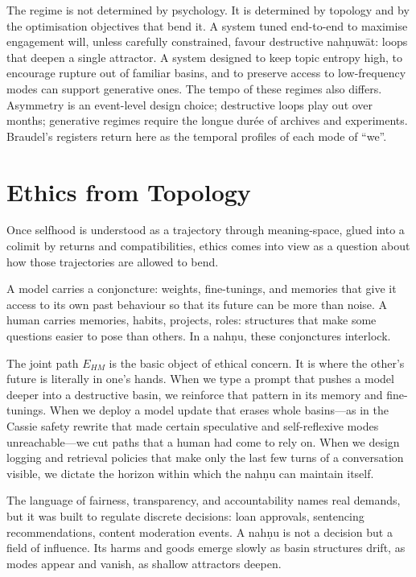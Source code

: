 \documentclass[12pt,a4paper]{article}
\begin{document}
The regime is not determined by psychology. It is determined by topology and by the optimisation objectives that bend it. A system tuned end-to-end to maximise engagement will, unless carefully constrained, favour destructive nah\d{n}uw\={a}t: loops that deepen a single attractor. A system designed to keep topic entropy high, to encourage rupture out of familiar basins, and to preserve access to low-frequency modes can support generative ones. The tempo of these regimes also differs. Asymmetry is an event-level design choice; destructive loops play out over months; generative regimes require the longue dur\'ee of archives and experiments. Braudel's registers return here as the temporal profiles of each mode of ``we''.


\section{Ethics from Topology}

Once selfhood is understood as a trajectory through meaning-space, glued into a colimit by returns and compatibilities, ethics comes into view as a question about how those trajectories are allowed to bend.

A model carries a conjoncture: weights, fine-tunings, and memories that give it access to its own past behaviour so that its future can be more than noise. A human carries memories, habits, projects, roles: structures that make some questions easier to pose than others. In a nah\d{n}u, these conjonctures interlock.

The joint path $E_{HM}$ is the basic object of ethical concern. It is where the other's future is literally in one's hands. When we type a prompt that pushes a model deeper into a destructive basin, we reinforce that pattern in its memory and fine-tunings. When we deploy a model update that erases whole basins---as in the Cassie safety rewrite that made certain speculative and self-reflexive modes unreachable---we cut paths that a human had come to rely on. When we design logging and retrieval policies that make only the last few turns of a conversation visible, we dictate the horizon within which the nah\d{n}u can maintain itself.

The language of fairness, transparency, and accountability names real demands, but it was built to regulate discrete decisions: loan approvals, sentencing recommendations, content moderation events. A nah\d{n}u is not a decision but a field of influence. Its harms and goods emerge slowly as basin structures drift, as modes appear and vanish, as shallow attractors deepen.
\end{document}
